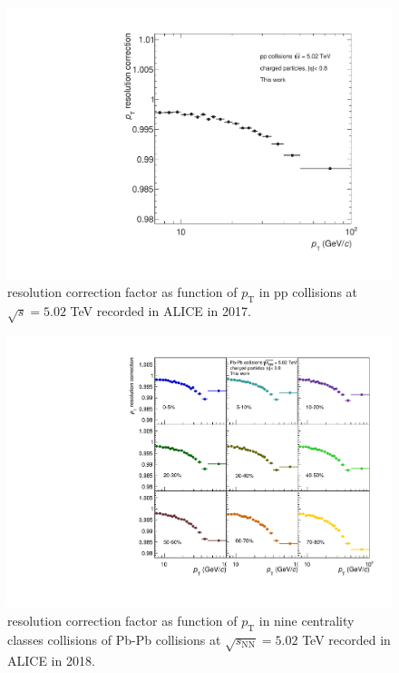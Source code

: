 \documentclass[12pt,a4paper]{report}
\begin{document}
\begin{figure}[tb!]
\centering
\includegraphics[width=12cm]{Plots/ptrescorrpp.pdf}  
\caption{\pt resolution correction factor as function of $p_{\mathrm{T}}$ in pp collisions at $\sqrt{s} = 5.02$ TeV recorded in ALICE in 2017.}
\label{ptrescorrpp}
\end{figure}
\begin{figure}[tb!]
\centering
\includegraphics[width=12cm]{Plots/ptrescorrPbPb.pdf}  
\caption{\pt resolution correction factor as function of $p_{\mathrm{T}}$ in nine centrality classes collisions of Pb-Pb collisions at $\sqrt{s_\text{NN}} = 5.02$ TeV recorded in ALICE in 2018.}
\label{ptrescorrPbPb}
\end{figure}
\end{document}

